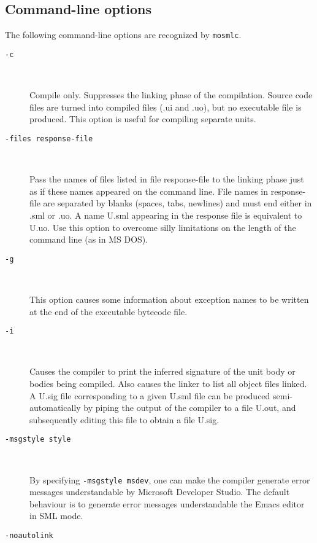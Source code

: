 \documentclass[fleqn]{article}
\begin{document}
\subsection{Command-line options}
\label{sec-mosmlc-options}

The following command-line options are recognized by {\tt mosmlc}.

\begin{description}
\item[{\tt -c}]\mbox{ }

  Compile only. Suppresses the linking phase of the compilation.
  Source code files are turned into compiled files (.ui and .uo), but
  no executable file is produced.  This option is useful for compiling
  separate units.

\item[{\tt -files {\rm response-file}}]\mbox{ }

  Pass the names of files listed in file response-file to the linking
  phase just as if these names appeared on the command line.  File
  names in response-file are separated by blanks (spaces, tabs,
  newlines) and must end either in .sml or .uo.  A name U.sml
  appearing in the response file is equivalent to U.uo.  Use this
  option to overcome silly limitations on the length of the
  command line (as in MS DOS).

\item[{\tt -g}]\mbox{ }

  This option causes some information about exception names to be
  written at the end of the executable bytecode file.  

\item[{\tt -i}]\mbox{ }

  Causes the compiler to print the inferred signature of the unit body
  or bodies being compiled.  Also causes the linker to list all object
  files linked.  A U.sig file corresponding to a given U.sml file can
  be produced semi-automatically by piping the output of the compiler
  to a file U.out, and subsequently editing this file to obtain a file
  U.sig.

\item[{\tt -msgstyle \textrm{style}}]\mbox{ }
  
  By specifying \texttt{-msgstyle msdev}, one can make the compiler
  generate error messages understandable by Microsoft Developer
  Studio.  The default behaviour is to generate error messages
  understandable the Emacs editor in SML mode.

\item[{\tt -noautolink}]\mbox{ }


\end{description}
\end{document}
